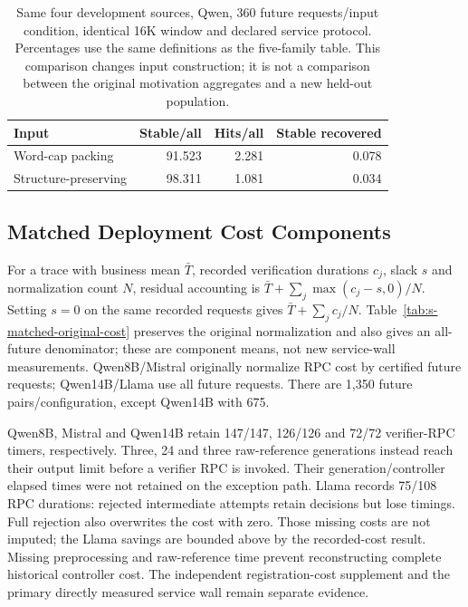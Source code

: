 \begin{table}[!htb]
\centering\small
\caption{Same four development sources, Qwen, 360 future requests/input condition, identical 16K window and declared service protocol. Percentages use the same definitions as the five-family table. This comparison changes input construction; it is not a comparison between the original motivation aggregates and a new held-out population.}
\label{tab:s-structure-paired}
\begin{tabular}{@{}lrrr@{}}
\toprule
Input & Stable/all & Hits/all & Stable recovered\\
\midrule
Word-cap packing & 91.523 & 2.281 & 0.078\\
Structure-preserving & 98.311 & 1.081 & 0.034\\
\bottomrule
\end{tabular}
\end{table}

\subsection{Matched Deployment Cost Components}
For a trace with business mean $\bar T$, recorded verification durations $c_j$, slack $s$ and normalization count $N$, residual accounting is $\bar T+\sum_j\max(c_j-s,0)/N$. Setting $s=0$ on the same recorded requests gives $\bar T+\sum_jc_j/N$. Table~\ref{tab:s-matched-original-cost} preserves the original normalization and also gives an all-future denominator; these are component means, not new service-wall measurements. Qwen8B/Mistral originally normalize RPC cost by certified future requests; Qwen14B/Llama use all future requests. There are 1,350 future pairs/configuration, except Qwen14B with 675.

Qwen8B, Mistral and Qwen14B retain 147/147, 126/126 and 72/72 verifier-RPC timers, respectively. Three, 24 and three raw-reference generations instead reach their output limit before a verifier RPC is invoked. Their generation/controller elapsed times were not retained on the exception path. Llama records 75/108 RPC durations: rejected intermediate attempts retain decisions but lose timings. Full rejection also overwrites the cost with zero. Those missing costs are not imputed; the Llama savings are bounded above by the recorded-cost result. Missing preprocessing and raw-reference time prevent reconstructing complete historical controller cost. The independent registration-cost supplement and the primary directly measured service wall remain separate evidence.

